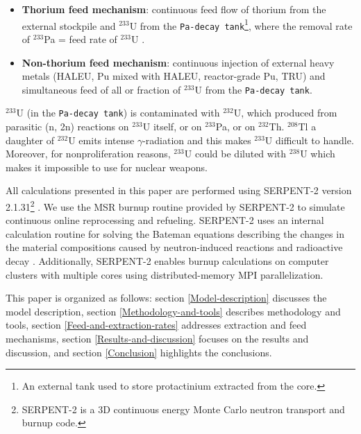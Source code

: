 \begin{itemize}
	\item \textbf{Thorium feed mechanism}: continuous feed flow of thorium from the external stockpile and $^{233}$U from the \texttt{Pa-decay tank}\footnote{An external tank used to store protactinium extracted from the core.}, where the removal rate of $^{233}$Pa = feed rate of $^{233}$U \cite{betzler2016modeling}.
	\item \textbf{Non-thorium feed mechanism}: continuous injection of external heavy metals (\gls{HALEU}, Pu mixed with \gls{HALEU}, reactor-grade Pu, \gls{TRU}) and simultaneous feed of all or fraction of $^{233}$U from the \texttt{Pa-decay tank}.
\end{itemize}

$^{233}$U (in the \texttt{Pa-decay tank}) is contaminated with $^{232}$U, which produced from parasitic (n, 2n) reactions on $^{233}$U itself, or on $^{233}$Pa, or on $^{232}$Th. $^{208}$Tl a daughter of $^{232}$U emits intense $\gamma$-radiation and this makes $^{233}$U difficult to handle. Moreover, for nonproliferation reasons, $^{233}$U could be diluted with $^{238}$U which makes it impossible to use for nuclear weapons.

All calculations presented in this paper are performed using SERPENT-2 version 2.1.31\footnote{SERPENT-2 is a 3D continuous energy Monte Carlo neutron 
	transport and burnup code.} \cite{leppanen2014serpent}. We use the MSR burnup routine provided by SERPENT-2 to simulate continuous online reprocessing and refueling. SERPENT-2 uses an internal calculation routine for solving the Bateman equations describing the changes in the material compositions caused by neutron-induced reactions and radioactive decay \cite{leppanen2014serpent}. Additionally, SERPENT-2 enables burnup calculations on computer clusters with multiple cores using distributed-memory MPI parallelization.

This paper is organized as follows: section \ref{Model-description} discusses the model description, section \ref{Methodology-and-tools} describes methodology and tools, section \ref{Feed-and-extraction-rates} addresses extraction and feed mechanisms, section \ref{Results-and-discussion} focuses on the results and discussion, and section \ref{Conclusion} highlights the conclusions.